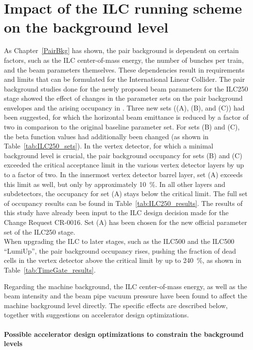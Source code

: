 \section{Impact of the ILC running scheme on the background level}

As Chapter~\ref{PairBkg} has shown, the pair background is dependent on certain factors, such as the ILC center-of-mass energy, the number of bunches per train, and the beam parameters themselves.
These dependencies result in requirements and limits that can be formulated for the International Linear Collider.
The pair background studies done for the newly proposed beam parameters for the ILC250 stage showed the effect of changes in the parameter sets on the pair background envelopes and the arising occupancy in \sid.
Three new sets ((A), (B), and (C)) had been suggested, for which the horizontal beam emittance is reduced by a factor of two in comparison to the original baseline parameter set.
For sets (B) and (C), the beta function values had additionally been changed (as shown in Table~\ref{tab:ILC250_sets}).
In the \sid vertex detector, for which a minimal background level is crucial, the pair background occupancy for sets (B) and (C) exceeded the critical acceptance limit in the various vertex detector layers by up to a factor of two.
In the innermost vertex detector barrel layer, set (A) exceeds this limit as well, but only by approximately \SI{10}{\percent}.
In all other layers and \sid subdetectors, the occupancy for set (A) stays below the critical limit.
The full set of occupancy results can be found in Table~\ref{tab:ILC250_results}.
The results of this study have already been input to the ILC design decision made for the Change Request CR-0016.
Set (A) has been chosen for the new official parameter set of the ILC250 stage.
\\When upgrading the ILC to later stages, such as the ILC500 and the ILC500 ``LumiUp'', the pair background occupancy rises, pushing the fraction of dead cells in the \sid vertex detector above the critical limit by up to \SI{240}{\percent}, as shown in Table~\ref{tab:TimeGate_results}.

Regarding the machine background, the ILC center-of-mass energy, as well as the beam intensity and the beam pipe vacuum pressure have been found to affect the machine background level directly.
The specific effects are described below, together with suggestions on accelerator design optimizations.

\paragraph{Possible accelerator design optimizations to constrain the background levels}

